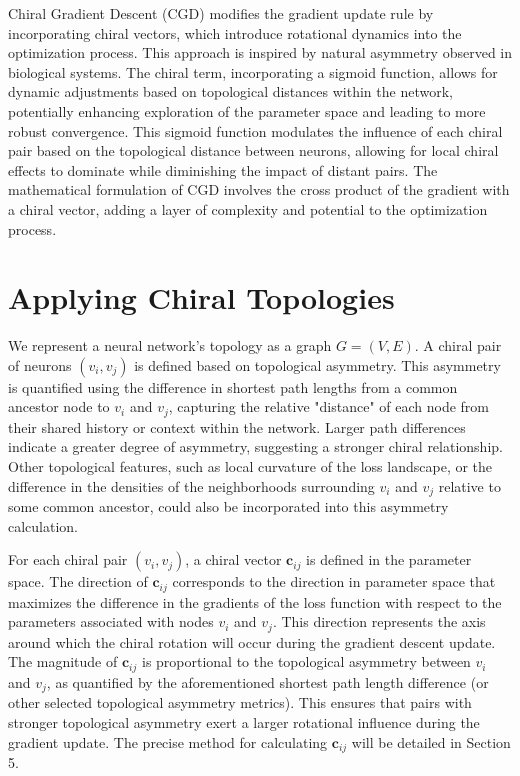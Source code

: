 \documentclass[12pt, a4paper]{article}
\begin{document}
Chiral Gradient Descent (CGD) modifies the gradient update rule by incorporating chiral vectors, which introduce rotational dynamics into the optimization process. This approach is inspired by natural asymmetry observed in biological systems. The chiral term, incorporating a sigmoid function, allows for dynamic adjustments based on topological distances within the network, potentially enhancing exploration of the parameter space and leading to more robust convergence. This sigmoid function modulates the influence of each chiral pair based on the topological distance between neurons, allowing for local chiral effects to dominate while diminishing the impact of distant pairs. The mathematical formulation of CGD involves the cross product of the gradient with a chiral vector, adding a layer of complexity and potential to the optimization process.

\section{Applying Chiral Topologies}

We represent a neural network's topology as a graph \(G = (V, E)\).  A chiral pair of neurons \((v_i, v_j)\) is defined based on topological asymmetry. This asymmetry is quantified using the difference in shortest path lengths from a common ancestor node to \(v_i\) and \(v_j\), capturing the relative "distance" of each node from their shared history or context within the network.  Larger path differences indicate a greater degree of asymmetry, suggesting a stronger chiral relationship.  Other topological features, such as local curvature of the loss landscape, or the difference in the densities of the neighborhoods surrounding \(v_i\) and \(v_j\) relative to some common ancestor, could also be incorporated into this asymmetry calculation.

For each chiral pair \((v_i, v_j)\), a chiral vector \(\mathbf{c}_{ij}\) is defined in the parameter space. The direction of \(\mathbf{c}_{ij}\) corresponds to the direction in parameter space that maximizes the difference in the gradients of the loss function with respect to the parameters associated with nodes \(v_i\) and \(v_j\). This direction represents the axis around which the chiral rotation will occur during the gradient descent update. The magnitude of \(\mathbf{c}_{ij}\) is proportional to the topological asymmetry between \(v_i\) and \(v_j\), as quantified by the aforementioned shortest path length difference (or other selected topological asymmetry metrics). This ensures that pairs with stronger topological asymmetry exert a larger rotational influence during the gradient update. The precise method for calculating \(\mathbf{c}_{ij}\) will be detailed in Section 5.
\end{document}
